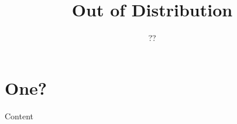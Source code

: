 \documentclass[11pt,fullpage]{article}
\begin{document}
\title{Out of Distribution}
\author{??}
\maketitle

\section{One?}

Content



\end{document}

